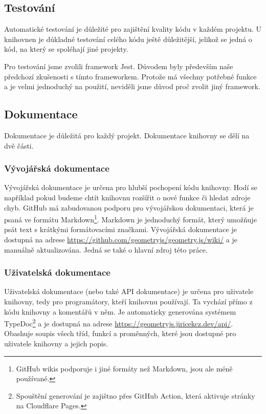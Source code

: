 \subsection{Testování}
\label{subsec:testing}

Automatické testování je důležité pro zajištění kvality kódu v každém projektu. 
U knihovnen je důkladné testování celého kódu ještě důležitější, jelikož se jedná o kód, na který se spoléhají jiné projekty.

Pro testování jsme zvolili framework Jest\cite{geometryjs:wiki:technologies}.
Důvodem byly především naše předchozí zkušenosti s tímto frameworkem.
Protože má všechny potřebné funkce a je velmi jednoduchý na použití, neviděli jsme důvod proč zvolit jiný framework.

\subsection{Dokumentace}
\label{subsec:documentation}

Dokumentace je důležitá pro každý projekt.
Dokumentace knihovny se dělí na dvě části.

\subsubsection{Vývojářská dokumentace}
\label{subsubsec:developer-documentation}

Vývojářská dokumentace je určena pro hlubší pochopení kódu knihovny.
Hodí se například pokud budeme chtít knihovnu rozšířit o nové funkce či hledat zdroje chyb.
GitHub má zabudovanou podporu pro vývojářskou dokumentaci\cite{GitHub:wikis}, která je psaná ve formátu Markdown\footnote{GitHub wikis podporuje i jiné formáty než Markdown, jsou ale méně používané.}.
Markdown je jednoduchý formát, který umožňuje psát text s krátkými formátovacími značkami\cite{GitHub:markdown}.
Vývojářská dokumentace je dostupná na adrese \url{https://github.com/geometryjs/geometry.js/wiki/} a je manuálně aktualizována. 
Jedná se také o hlavní zdroj této práce.

\subsubsection{Uživatelská dokumentace}
\label{subsubsec:user-documentation}

Uživatelská dokumentace (nebo také API dokumentace) je určena pro uživatele knihovny, tedy pro programátory, kteří knihovnu používají.
Ta vychází přímo z kódu knihovny a komentářů v něm.
Je automaticky generována systémem TypeDoc\footnote{Spouštění generování je zajištno přes GitHub Action, která aktivuje  stránky na Cloudflare Pages\cite{geometryjs:wiki:api}.}\cite{geometryjs:wiki:technologies} a je dostupná na adrese \url{https://geometryjs.jiricekcz.dev/api/}.
Obashuje soupis všech tříd, funkcí a proměnných, které jsou dostupné pro uživatele knihovny a jejich popis.